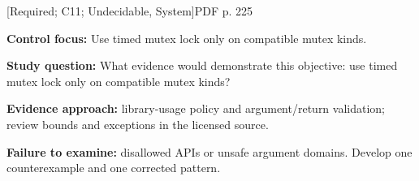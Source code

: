 \documentclass[10pt,letterpaper]{article}
\begin{document}
\smallskip
{}
 \textsf{\footnotesize [Required; C11; Undecidable, System]}\hfill{\footnotesize PDF p. 225}\par
\textbf{Control focus:} Use timed mutex lock only on compatible mutex kinds.\par
\textbf{Study question:} What evidence would demonstrate this objective: use timed mutex lock only on compatible mutex kinds?\par
\textbf{Evidence approach:} library-usage policy and argument/return validation; review bounds and exceptions in the licensed source.\par
\textbf{Failure to examine:} disallowed APIs or unsafe argument domains. Develop one counterexample and one corrected pattern.\par
\smallskip
\end{document}
